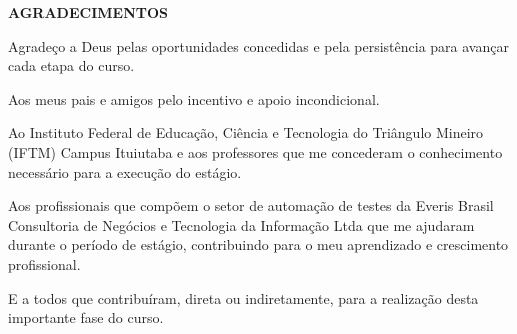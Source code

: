 \newpage
\thispagestyle{empty}

\begin{center}
\textbf{AGRADECIMENTOS}
\vspace*{3.5 cm}
\end{center}

Agradeço a Deus pelas oportunidades concedidas e pela persistência para avançar cada etapa do curso.\par
Aos meus pais e amigos pelo incentivo e apoio incondicional.\par
Ao Instituto Federal de Educação, Ciência e Tecnologia do Triângulo Mineiro (IFTM) Campus Ituiutaba e aos professores que me concederam o conhecimento necessário para a execução do estágio.\par
Aos profissionais que compõem o setor de automação de testes da Everis Brasil Consultoria de Negócios e Tecnologia da Informação Ltda que me ajudaram durante o período de estágio, contribuindo para o meu aprendizado e crescimento profissional.\par
E a todos que contribuíram, direta ou indiretamente, para a realização desta importante fase do curso.

